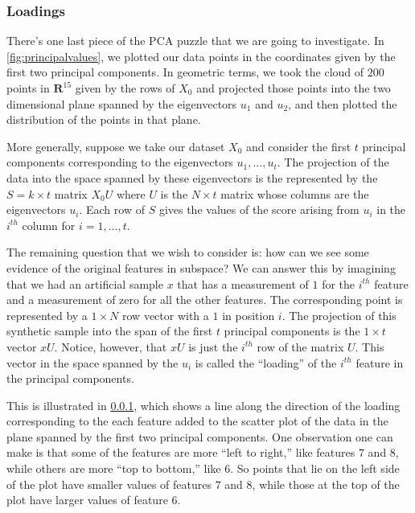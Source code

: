 \documentclass[
]{article}
\begin{document}
\hypertarget{loadings}{%
\subsubsection{Loadings}\label{loadings}}

There's one last piece of the PCA puzzle that we are going to
investigate. In \cref{fig:principalvalues}, we plotted our data points
in the coordinates given by the first two principal components. In
geometric terms, we took the cloud of \(200\) points in
\(\mathbf{R}^{15}\) given by the rows of \(X_{0}\) and projected those
points into the two dimensional plane spanned by the eigenvectors
\(u_{1}\) and \(u_{2}\), and then plotted the distribution of the points
in that plane.

More generally, suppose we take our dataset \(X_{0}\) and consider the
first \(t\) principal components corresponding to the eigenvectors
\(u_{1},\ldots, u_{t}\). The projection of the data into the space
spanned by these eigenvectors is the represented by the
\(S = k\times t\) matrix \(X_{0}U\) where \(U\) is the \(N\times t\)
matrix whose columns are the eigenvectors \(u_{i}\). Each row of \(S\)
gives the values of the score arising from \(u_{i}\) in the \(i^{th}\)
column for \(i=1,\ldots, t\).

The remaining question that we wish to consider is: how can we see some
evidence of the original features in subspace? We can answer this by
imagining that we had an artificial sample \(x\) that has a measurement
of \(1\) for the \(i^{th}\) feature and a measurement of zero for all
the other features. The corresponding point is represented by a
\(1\times N\) row vector with a \(1\) in position \(i\). The projection
of this synthetic sample into the span of the first \(t\) principal
components is the \(1\times t\) vector \(xU\). Notice, however, that
\(xU\) is just the \(i^{th}\) row of the matrix \(U\). This vector in
the space spanned by the \(u_{i}\) is called the ``loading'' of the
\(i^{th}\) feature in the principal components.

This is illustrated in \cref{loadings}, which shows a line along the
direction of the loading corresponding to the each feature added to the
scatter plot of the data in the plane spanned by the first two principal
components. One observation one can make is that some of the features
are more ``left to right,'' like features \(7\) and \(8\), while others
are more ``top to bottom,'' like \(6\). So points that lie on the left
side of the plot have smaller values of features \(7\) and \(8\), while
those at the top of the plot have larger values of feature \(6\).
\end{document}

